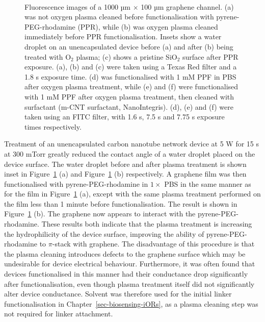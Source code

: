 \documentclass[
  a4paper,
]{scrbook}
\begin{document}
\begin{figure}
\begin{minipage}[t]{0.45\linewidth}
{{}

}

\end{minipage}%
%
\begin{minipage}[t]{0.01\linewidth}

{\centering 

~

}

\end{minipage}%

\caption[Fluorescence images of a 1000 µm \(\times\) 100 µm graphene
channel, showing the effects of oxygen plasma cleaning and surfactant
rinsing on fluorescent linker
functionalisation.]{\label{fig-silicon-dioxide-interaction}Fluorescence
images of a 1000 µm \(\times\) 100 µm graphene channel. (a) was not
oxygen plasma cleaned before functionalisation with pyrene-PEG-rhodamine
(PPR), while (b) was oxygen plasma cleaned immediately before PPR
functionalisation. Insets show a water droplet on an unencapsulated
device before (a) and after (b) being treated with O\(_2\) plasma; (c)
shows a pristine SiO\(_2\) surface after PPR exposure. (a), (b) and (c)
were taken using a Texas Red filter and a 1.8 s exposure time. (d) was
functionalised with 1 mM PPF in PBS after oxygen plasma treatment, while
(e) and (f) were functionalised with 1 mM PPF after oxygen plasma
treatment, then cleaned with surfactant (m-CNT surfactant,
NanoIntegris). (d), (e) and (f) were taken using an FITC filter, with
1.6 s, 7.5 s and 7.75 s exposure times respectively.}

\end{figure}

Treatment of an unencapsulated carbon nanotube network device at 5 W for
15 s at 300 mTorr greatly reduced the contact angle of a water droplet
placed on the device surface. The water droplet before and after plasma
treatment is shown inset in Figure~\ref{fig-silicon-dioxide-interaction}
(a) and Figure~\ref{fig-silicon-dioxide-interaction} (b) respectively. A
graphene film was then functionalised with pyrene-PEG-rhodamine in
\(1 \times\) PBS in the same manner as for the film in
Figure~\ref{fig-silicon-dioxide-interaction} (a), except with the same
plasma treatment performed on the film less than 1 minute before
functionalisation. The result is shown in
Figure~\ref{fig-silicon-dioxide-interaction} (b). The graphene now
appears to interact with the pyrene-PEG-rhodamine. These results both
indicate that the plasma treatment is increasing the hydrophilicity of
the device surface, improving the ability of pyrene-PEG-rhodamine to
\(\pi\)-stack with graphene. The disadvantage of this procedure is that
the plasma cleaning introduces defects to the graphene surface which may
be undesirable for device electrical behaviour. Furthermore, it was
often found that devices functionalised in this manner had their
conductance drop significantly after functionalisation, even though
plasma treatment itself did not significantly alter device conductance.
Solvent was therefore used for the initial linker functionalisation in
Chapter~\ref{sec-biosensing-iORs}, as a plasma cleaning step was not
required for linker attachment.
\end{document}
